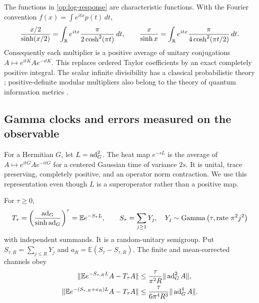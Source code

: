 The functions in \eqref{op:log-response} are characteristic functions.
With the Fourier convention $f(x)=\int e^{itx}p(t)\,dt$,
\begin{equation}
 \frac{x/2}{\sinh(x/2)}
 =\int_{\mathbb R}e^{itx}\frac{\pi}{2\cosh^2(\pi t)}\,dt,
 \qquad
 \frac x{\sinh x}
 =\int_{\mathbb R}e^{itx}\frac{\pi}{4\cosh^2(\pi t/2)}\,dt.
 \label{op:fourier-log}
\end{equation}
Consequently each multiplier is a positive average of unitary
conjugations $A\mapsto e^{itK}Ae^{-itK}$. This replaces ordered Taylor
coefficients by an exact completely positive integral. The scalar infinite
divisibility has a classical probabilistic theory \citep{PitmanYor2003};
positive-definite modular multipliers also belong to the theory of
quantum information metrics \citep{HiaiKosakiPetzRuskai2013}.

\subsection{Gamma clocks and errors measured on the observable}

For a Hermitian $G$, let $L=\operatorname{ad}_G^2$. The heat map $e^{-sL}$ is the average
of $A\mapsto e^{itG}Ae^{-itG}$ for a centered Gaussian time of variance
$2s$. It is unital, trace preserving, completely positive, and an operator
norm contraction. We use this representation even though $L$ is a
superoperator rather than a positive map.

\begin{theorem}
\label{op:hyperbolic-clock}
For $\tau\ge0$,
\begin{equation}
 T_\tau=\left(\frac{\operatorname{ad}_G}{\sinh\operatorname{ad}_G}\right)^\tau
 =\mathbb E e^{-S_\tau L},\qquad
 S_\tau=\sum_{j\ge1}Y_j,\quad
 Y_j\sim\operatorname{Gamma}\left(\tau,\text{rate }\pi^2j^2\right)
 \label{op:gamma-clock}
\end{equation}
with independent summands. It is a random-unitary semigroup. Put
$S_{\tau,R}=\sum_{j\le R}Y_j$ and
$a_R=\mathbb E(S_\tau-S_{\tau,R})$. The finite and mean-corrected channels
obey
\begin{align}
 \|\mathbb Ee^{-S_{\tau,R}L}A-T_\tau A\|
 &\le\frac{\tau}{\pi^2R}\|\operatorname{ad}_G^2A\|,\label{op:clock-first}\\
 \|\mathbb Ee^{-(S_{\tau,R}+a_R)L}A-T_\tau A\|
 &\le\frac{\tau}{6\pi^4R^3}\|\operatorname{ad}_G^4A\|.
 \label{op:clock-mean}
\end{align}
\end{theorem}

